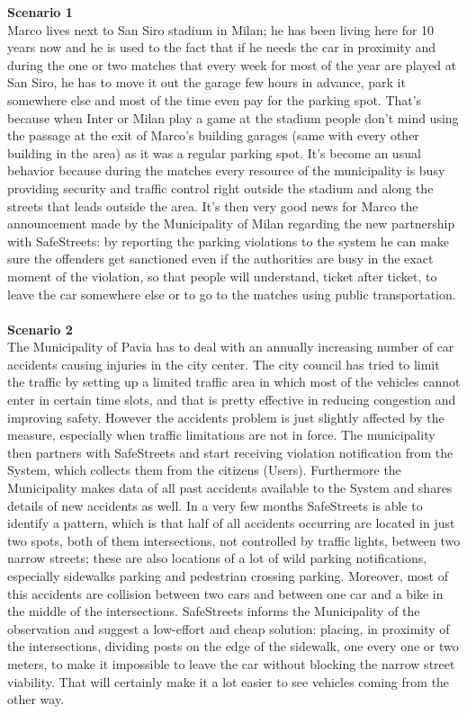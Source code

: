 \documentclass {article}
\begin{document}
		{\bf Scenario 1}\\
		Marco lives next to San Siro stadium in Milan; he has been living here for 10 years now and he is used to the fact that if he needs the car in proximity and during the one or two matches that every week for most of the year are played at San Siro, he has to move it out the garage few hours in advance, park it somewhere else and most of the time even pay for the parking spot. That’s because when Inter or Milan play a game at the stadium people don’t mind using the passage at the exit of Marco’s building garages (same with every other building in the area) as it was a regular parking spot. It’s become an usual behavior because during the matches every resource of the municipality is busy providing security and traffic control right outside the stadium and along the streets that leads outside the area. It’s then very good news for Marco the announcement made by the Municipality of Milan regarding the new partnership with SafeStreets: by reporting the parking violations to the system he can make sure the offenders get sanctioned even if the authorities are busy in the exact moment of the violation, so that people will understand, ticket after ticket, to leave the car somewhere else or to go to the matches using public transportation.\\ \\
		{\bf Scenario 2}\\
		The Municipality of Pavia has to deal with an annually increasing number of car accidents causing injuries in the city center. The city council has tried to limit the traffic by setting up a limited traffic area in which most of the vehicles cannot enter in certain time slots, and that is pretty effective in reducing congestion and improving safety. However the accidents problem is just slightly affected by the measure, especially when traffic limitations are not in force. The municipality then partners with SafeStreets and start receiving violation notification from the System, which collects them from the citizens (Users). Furthermore the Municipality makes data of all past accidents available to the System and shares details of new accidents as well. In a very few months SafeStreets is able to identify a pattern, which is that half of all accidents occurring are located in just two spots, both of them intersections, not controlled by traffic lights, between two narrow streets; these are also locations of a lot of wild parking notifications, especially sidewalks parking and pedestrian crossing parking. Moreover, most of this accidents are collision between two cars and between one car and a bike in the middle of the intersections. SafeStreets informs the Municipality of the observation and suggest a low-effort and cheap solution: placing, in proximity of the intersections, dividing posts on the edge of the sidewalk, one every one or two meters, to make it impossible to leave the car without blocking the narrow street viability. That will certainly make it a lot easier to see vehicles coming from the other way.\\ \\
\end{document}
